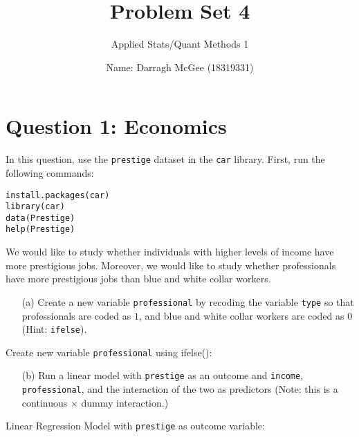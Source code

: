 \documentclass[12pt,letterpaper]{article}
\title{Problem Set 4}
\date {Name: Darragh McGee (18319331)\\}
\author{Applied Stats/Quant Methods 1}
\begin{document}
	\maketitle
	\vspace{.5cm}
\section*{Question 1: Economics}
\vspace{.25cm}
\noindent 	
In this question, use the \texttt{prestige} dataset in the \texttt{car} library. First, run the following commands:

\begin{verbatim}
install.packages(car)
library(car)
data(Prestige)
help(Prestige)
\end{verbatim} 


\noindent We would like to study whether individuals with higher levels of income have more prestigious jobs. Moreover, we would like to study whether professionals have more prestigious jobs than blue and white collar workers.

\begin{enumerate}
	\item [(a)]
	Create a new variable \texttt{professional} by recoding the variable \texttt{type} so that professionals are coded as $1$, and blue and white collar workers are coded as $0$ (Hint: \texttt{ifelse}).
\end{enumerate}
	
\noindent Create new variable \texttt{professional} using ifelse():


\begin{enumerate}
	\item [(b)]
	Run a linear model with \texttt{prestige} as an outcome and \texttt{income}, \texttt{professional}, and the interaction of the two as predictors (Note: this is a continuous $\times$ dummy interaction.)
\end{enumerate}
\noindent Linear Regression Model with \texttt{prestige} as outcome variable: 

\end{document}
